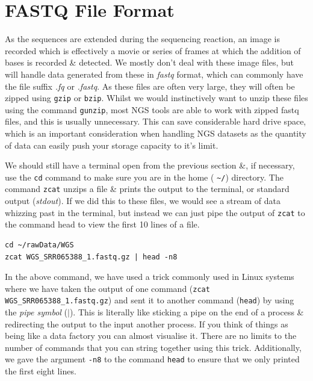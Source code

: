 \section{FASTQ File Format}
\begin{note}
As the sequences are extended during the sequencing reaction, an image is recorded which is effectively a movie or series of frames at which the addition of bases is recorded \& detected.
We mostly don't deal with these image files, but will handle data generated from these in \textit{fastq} format, which can commonly have the file suffix \textit{.fq} or \textit{.fastq}.
As these files are often very large, they will often be zipped using \texttt{gzip} or \texttt{bzip}.
Whilst we would instinctively want to unzip these files using the command \texttt{gunzip}, most NGS tools are able to work with zipped fastq files, and this is usually unnecessary.
This can save considerable hard drive space, which is an important consideration when handling NGS datasets as the quantity of data can easily push your storage capacity to it's limit. \\
\end{note}

\begin{steps}
We should still have a terminal open from the previous section \&, if necessary, use the \texttt{cd} command to make sure you are in the home ( \texttt{\~{}/}) directory.
The command \texttt{zcat} unzips a file \& prints the output to the terminal, or standard output (\textit{stdout}).
If we did this to these files, we would see a stream of data whizzing past in the terminal, but instead we can just pipe the output of \texttt{zcat} to the command head to view the first 10 lines of a file. \\
\begin{lstlisting}
cd ~/rawData/WGS
zcat WGS_SRR065388_1.fastq.gz | head -n8
\end{lstlisting}
\end{steps}

\begin{information}
In the above command, we have used a trick commonly used in Linux systems where we have taken the output of one command (\texttt{zcat WGS\_SRR065388\_1.fastq.gz}) and sent it to another command (\texttt{head}) by using the \textit{pipe symbol} ($\mid$).
This is literally like sticking a pipe on the end of a process \& redirecting the output to the input another process.
If you think of things as being like a data factory you can almost visualise it.
There are no limits to the number of commands that you can string together using this trick.
Additionally, we gave the argument \texttt{-n8} to the command \texttt{head} to ensure that we only printed the first eight lines.\\
\end{information}

